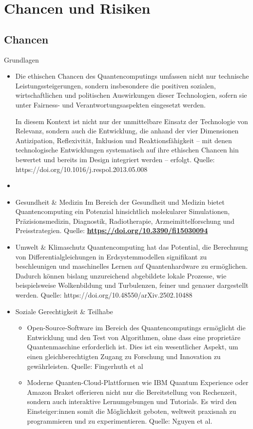 \section{Chancen und Risiken}

\subsection{Chancen}

\item Grundlagen
\begin{itemize}
    \item Die ethischen Chancen des Quantencomputings umfassen nicht nur technische Leistungssteigerungen, sondern insbesondere die positiven sozialen, wirtschaftlichen und politischen Auswirkungen dieser Technologien, sofern sie unter Fairness- und Verantwortungsaspekten eingesetzt werden. \cite{arrow_holistic_2023}

In diesem Kontext ist nicht nur der unmittelbare Einsatz der Technologie von Relevanz, sondern auch die Entwicklung, die anhand der vier Dimensionen Antizipation, Reflexivität, Inklusion und Reaktionsfähigkeit – mit denen technologische Entwicklungen systematisch auf ihre ethischen Chancen hin bewertet und bereits im Design integriert werden – erfolgt. Quelle: https://doi.org/10.1016/j.respol.2013.05.008

\item \item Gesundheit \& Medizin
Im Bereich der Gesundheit und Medizin bietet Quantencomputing ein Potenzial hinsichtlich molekularer Simulationen, Präzisionsmedizin, Diagnostik, Radiotherapie, Arzneimittelforschung und Preisstrategien. Quelle: \href{https://doi.org/10.3390/fi15030094}{\textbf{https://doi.org/10.3390/fi15030094}}

\item Umwelt \& Klimaschutz
Quantencomputing hat das Potential, die Berechnung von Differentialgleichungen in Erdsystemmodellen signifikant zu beschleunigen und maschinelles Lernen auf Quantenhardware zu ermöglichen. Dadurch können bislang unzureichend abgebildete lokale Prozesse, wie beispielsweise Wolkenbildung und Turbulenzen, feiner und genauer dargestellt werden. Quelle: https://doi.org/10.48550/arXiv.2502.10488

\item Soziale Gerechtigkeit \& Teilhabe
\begin{itemize}
    \item Open-Source-Software im Bereich des Quantencomputings ermöglicht die Entwicklung und den Test von Algorithmen, ohne dass eine proprietäre Quantenmaschine erforderlich ist. Dies ist ein wesentlicher Aspekt, um einen gleichberechtigten Zugang zu Forschung und Innovation zu gewährleisten. Quelle: Fingerhuth et al
    \item Moderne Quanten-Cloud-Plattformen wie IBM Quantum Experience oder Amazon Braket offerieren nicht nur die Bereitstellung von Rechenzeit, sondern auch interaktive Lernumgebungen und Tutorials. Es wird den Einsteiger:innen somit die Möglichkeit geboten, weltweit praxisnah zu programmieren und zu experimentieren. Quelle: Nguyen et al.


\end{itemize}
\end{itemize}
